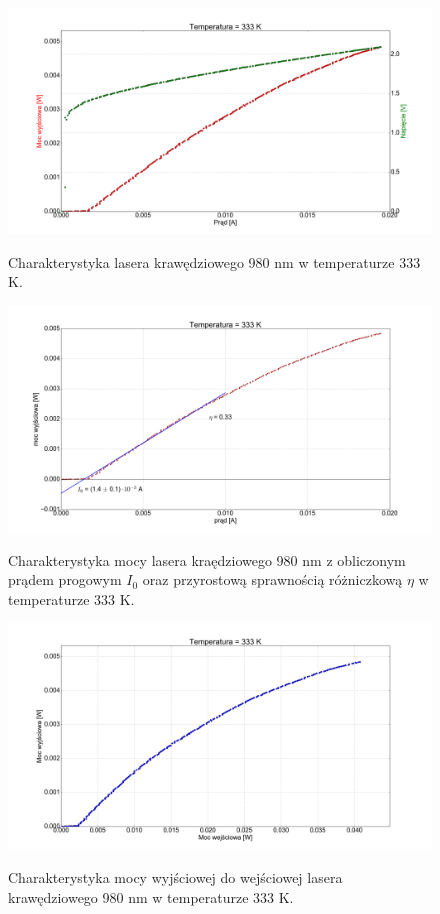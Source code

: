 \documentclass[a4paper, portrait,12pt]{report}
\begin{document}
\begin{figure}
\center
  \includegraphics[scale=0.30]{plot980/temp_60_IVL.png}
  \label{rys1}
  \caption{Charakterystyka lasera krawędziowego 980 nm w temperaturze 333 K.} 
\end{figure}

\begin{figure}
\center
  \includegraphics[scale=0.30]{plot980/temp_60_fit.png}
  \label{rys1}
  \caption{Charakterystyka mocy lasera kraędziowego 980 nm z obliczonym prądem progowym $I_0$ oraz przyrostową sprawnością różniczkową $\eta$ w temperaturze 333 K.} 
\end{figure}

\begin{figure}
\center
  \includegraphics[scale=0.30]{plot980/temp_60_power.png}
  \label{rys1}
  \caption{Charakterystyka mocy wyjściowej do wejściowej lasera krawędziowego 980 nm w temperaturze 333 K.} 
\end{figure}
\end{document}
